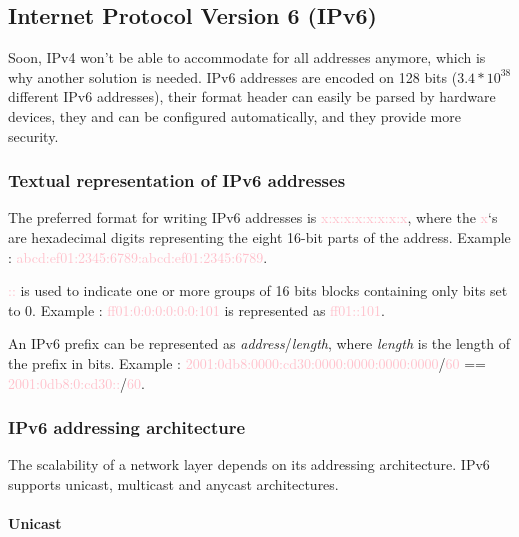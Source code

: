 \subsection[IPv6]{Internet Protocol Version 6 (IPv6)}

Soon, IPv4 won't be able to accommodate for all addresses anymore, which is why another solution is needed.
IPv6 addresses are encoded on 128 bits ($3.4*10^{38}$ different IPv6 addresses), their format header can easily be parsed by hardware devices, they and can be configured automatically, and they provide more security.

\subsubsection{Textual representation of IPv6 addresses}

The preferred format for writing IPv6 addresses is \textcolor{pink}{x:x:x:x:x:x:x:x}, where the \textcolor{pink}{x}‘s are hexadecimal digits representing the eight 16-bit parts of the address. Example : \textcolor{pink}{abcd:ef01:2345:6789:abcd:ef01:2345:6789}.

\textcolor{pink}{::} is used to indicate one or more groups of 16 bits blocks containing only bits set to 0. Example : \textcolor{pink}{ff01:0:0:0:0:0:0:101} is represented as \textcolor{pink}{ff01::101}.

An IPv6 prefix can be represented as \textit{address}/\textit{length}, where \textit{length} is the length of the prefix in bits. Example : \textcolor{pink}{2001:0db8:0000:cd30:0000:0000:0000:0000}/\textcolor{pink}{60} == \textcolor{pink}{2001:0db8:0:cd30::}/\textcolor{pink}{60}.

\subsubsection{IPv6 addressing architecture}

The scalability of a network layer depends on its addressing architecture. IPv6 supports unicast, multicast and anycast architectures.

\paragraph{Unicast}

